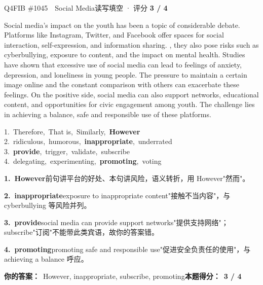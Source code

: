 \begin{qblock}{Q4\quad FIB \#1045\ \ Social Media}{读写填空 · 评分 \textcolor{cAccent}{\bfseries 3 / 4}}
\begin{promptbox}
Social media's impact on the youth has been a topic of considerable debate. Platforms like Instagram, Twitter, and Facebook offer spaces for social interaction, self-expression, and information sharing. , they also pose risks such as cyberbullying, exposure to  content, and the impact on mental health. Studies have shown that excessive use of social media can lead to feelings of anxiety, depression, and loneliness in young people. The pressure to maintain a certain image online and the constant comparison with others can exacerbate these feelings. On the positive side, social media can also  support networks, educational content, and opportunities for civic engagement among youth. The challenge lies in achieving a balance,  safe and responsible use of these platforms.
\end{promptbox}
{\small
1.\ Therefore,\ That is,\ Similarly,\ \textbf{However}\\
2.\ ridiculous,\ humorous,\ \textbf{inappropriate},\ underrated\\
3.\ \textbf{provide},\ trigger,\ validate,\ subscribe\\
4.\ delegating,\ experimenting,\ \textbf{promoting},\ voting}
\begin{notebox}\footnotesize
\textbf{1.\ However}\quad 前句讲平台的好处、本句讲风险，语义转折，用 However"然而"。\par\smallskip
\textbf{2.\ inappropriate}\quad exposure to inappropriate content"接触不当内容"，与 cyberbullying 等风险并列。\par\smallskip
\textbf{3.\ provide}\quad social media can provide support networks"提供支持网络"；subscribe"订阅"不能带此类宾语，故你的答案错。\par\smallskip
\textbf{4.\ promoting}\quad promoting safe and responsible use"促进安全负责任的使用"，与 achieving a balance 呼应。
\end{notebox}
\smallskip
\textbf{你的答案：}\ However, inappropriate, {\color{cWrong}subscribe}, promoting\qquad\textbf{本题得分：}\ {\color{cAccent}\bfseries 3 / 4}
\end{qblock}

